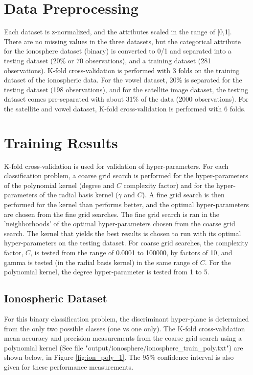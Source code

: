 \documentclass[tikz]{article}
\begin{document}
\section{Data Preprocessing}
\label{sec:preprocessing}
Each dataset is z-normalized, and the attributes scaled in the range of [0,1]. There are no missing values in the three datasets, but the categorical attribute for the ionosphere dataset (binary) is converted to 0/1 and separated into a testing dataset (20\% or 70 observations), and a training dataset (281 observations). K-fold cross-validation is performed with 3 folds on the training dataset of the ionospheric data. For the vowel dataset, 20\% is separated for the testing dataset (198 observations), and for the satellite image dataset, the testing dataset comes pre-separated with about 31\% of the data (2000 observations). For the satellite and vowel dataset, K-fold cross-validation is performed with 6 folds.

\begin{comment}
TODO: Add info on preprocessing of other 2 datasets
\end{comment}

\section{Training Results}
\label{sec:res_tr}
K-fold cross-validation is used for validation of hyper-parameters. For each classification problem, a coarse grid search is performed for the hyper-parameters of the polynomial kernel (degree and $C$ complexity factor) and for the hyper-parameters of the radial basis kernel ($\gamma$ and $C$). A fine grid search is then performed for the kernel than performs better, and the optimal hyper-parameters are chosen from the fine grid searches. The fine grid search is ran in the 'neighborhoods' of the optimal hyper-parameters chosen from the coarse grid search. The kernel that yields the best results is chosen to run with its optimal hyper-parameters on the testing dataset. For coarse grid searches, the complexity factor, $C$, is tested from the range of 0.0001 to 100000, by factors of 10, and gamma is tested (in the radial basis kernel) in the same range of $C$. For the polynomial kernel, the degree hyper-parameter is tested from 1 to 5.

\subsection{Ionospheric Dataset}
\label{sec:ionosphere}
For this binary classification problem, the discriminant hyper-plane is determined from the only two possible classes (one vs one only). The K-fold cross-validation mean accuracy and precision measurements from the coarse grid search using a polynomial kernel (See file "output/ionosphere/ionosphere\_train\_poly.txt") are shown below, in Figure \ref{fig:ion_poly_1}. The 95\% confidence interval is also given for these performance measurements.
\end{document}
